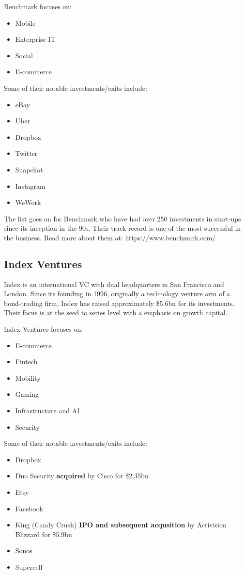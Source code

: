 \documentclass[a4paper]{article}
\begin{document}
{\vspace{5pt}
\noindent Benchmark focuses on:
\begin{itemize}
	\item Mobile
	\item Enterprise IT
	\item Social
	\item E-commerce
\end{itemize}
\vspace{5pt}
\noindent Some of their notable investments/exits include:
\begin{itemize}
	\item eBay
	\item Uber
	\item Dropbox
	\item Twitter
	\item Snapchat
	\item Instagram
	\item WeWork
\end{itemize}

\vspace{5pt}
The list goes on for Benchmark who have had over 250 investments in start-ups since its inception in the 90s. Their track record is one of the most successful in the business. Read more about them at: https://www.benchmark.com/

\subsection{Index Ventures}
Index is an international VC with dual headquarters in San Francisco and London. Since its founding in 1996, originally a technology venture arm of a bond-trading firm, Index has raised approximately \$5.6bn for its investments. Their focus is at the seed to series level with a emphasis on growth capital.

\vspace{5pt}
\noindent Index Ventures focuses on:
\begin{itemize}
	\item E-commerce
	\item Fintech
	\item Mobility
	\item Gaming
	\item Infrastructure and AI
	\item Security
\end{itemize}

\vspace{5pt}
\noindent Some of their notable investments/exits include:
\begin{itemize}
	\item Dropbox
	\item Duo Security \textbf{acquired} by Cisco for \$2.35bn
	\item Etsy
	\item Facebook
	\item King (Candy Crush) \textbf{IPO and subsequent acqusition} by Activision Blizzard for \$5.9bn
	\item Sonos
	\item Supercell
\end{itemize}

}
\end{document}

